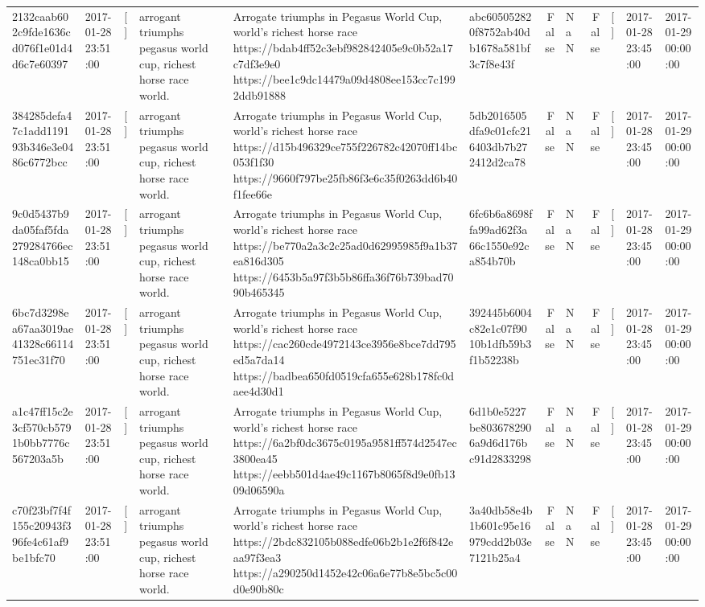 \begin{tabular}{llllllrlrlll}
2132caab602c9fde1636cd076f1e01d4d6c7e60397 & 2017-01-28 23:51:00 & [] & arrogant triumphs pegasus world cup, richest horse race world. & Arrogate triumphs in Pegasus World Cup, world's richest horse race https://bdab4ff52c3ebf982842405e9c0b52a17c7df3e9e0 https://bee1c9dc14479a09d4808ee153cc7c1992ddb91888 & abc605052820f8752ab40db1678a581bf3c7f8e43f & False & NaN & False & [] & 2017-01-28 23:45:00 & 2017-01-29 00:00:00 \\
384285defa47c1add119193b346e3e0486c6772bcc & 2017-01-28 23:51:00 & [] & arrogant triumphs pegasus world cup, richest horse race world. & Arrogate triumphs in Pegasus World Cup, world's richest horse race https://d15b496329ce755f226782c42070ff14bc053f1f30 https://9660f797be25fb86f3e6c35f0263dd6b40f1fee66e & 5db2016505dfa9c01cfc216403db7b272412d2ca78 & False & NaN & False & [] & 2017-01-28 23:45:00 & 2017-01-29 00:00:00 \\
9c0d5437b9da05faf5fda279284766ec148ca0bb15 & 2017-01-28 23:51:00 & [] & arrogant triumphs pegasus world cup, richest horse race world. & Arrogate triumphs in Pegasus World Cup, world's richest horse race https://be770a2a3c2c25ad0d62995985f9a1b37ea816d305 https://6453b5a97f3b5b86ffa36f76b739bad7090b465345 & 6fc6b6a8698ffa99ad62f3a66c1550e92ca854b70b & False & NaN & False & [] & 2017-01-28 23:45:00 & 2017-01-29 00:00:00 \\
6bc7d3298ea67aa3019ae41328c66114751ec31f70 & 2017-01-28 23:51:00 & [] & arrogant triumphs pegasus world cup, richest horse race world. & Arrogate triumphs in Pegasus World Cup, world's richest horse race https://cac260cde4972143ce3956e8bce7dd795ed5a7da14 https://badbea650fd0519cfa655e628b178fc0daee4d30d1 & 392445b6004c82e1c07f9010b1dfb59b3f1b52238b & False & NaN & False & [] & 2017-01-28 23:45:00 & 2017-01-29 00:00:00 \\
a1c47ff15c2e3cf570cb5791b0bb7776c567203a5b & 2017-01-28 23:51:00 & [] & arrogant triumphs pegasus world cup, richest horse race world. & Arrogate triumphs in Pegasus World Cup, world's richest horse race https://6a2bf0dc3675c0195a9581ff574d2547ec3800ea45 https://eebb501d4ae49c1167b8065f8d9e0fb1309d06590a & 6d1b0e5227be8036782906a9d6d176bc91d2833298 & False & NaN & False & [] & 2017-01-28 23:45:00 & 2017-01-29 00:00:00 \\
c70f23bf7f4f155c20943f396fe4c61af9be1bfc70 & 2017-01-28 23:51:00 & [] & arrogant triumphs pegasus world cup, richest horse race world. & Arrogate triumphs in Pegasus World Cup, world's richest horse race https://2bdc832105b088edfe06b2b1e2f6f842eaa97f3ea3 https://a290250d1452e42c06a6e77b8e5bc5c00d0e90b80c & 3a40db58e4b1b601c95e16979cdd2b03e7121b25a4 & False & NaN & False & [] & 2017-01-28 23:45:00 & 2017-01-29 00:00:00 \\

\end{tabular}
